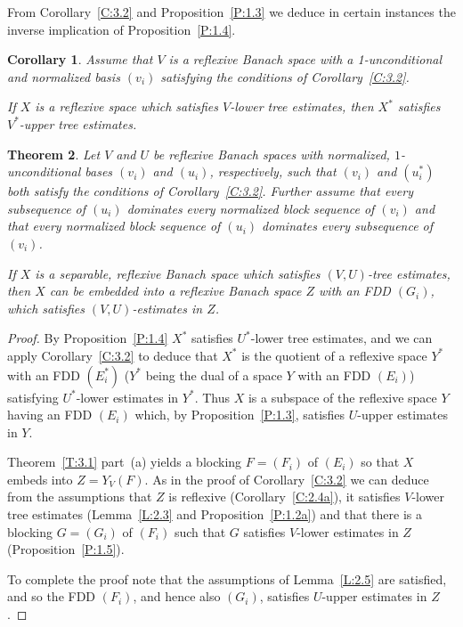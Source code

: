 \documentclass[11pt,leqno]{amsart}
\newtheorem{thm}{Theorem}[section]
\newtheorem{cor}[thm]{Corollary}
\theoremstyle{definition}
\begin{document}
From Corollary~\ref{C:3.2} and Proposition~\ref{P:1.3} we deduce in
certain instances the inverse implication of Proposition~\ref{P:1.4}.

\begin{cor}\label{C:3.2a}
  Assume that $V$ is a  reflexive  Banach space with  a
  1-unconditional and normalized basis $(v_i)$
  satisfying the conditions of Corollary~\ref{C:3.2}.
  
  If $X$ is a reflexive space which satisfies $V$-lower tree
  estimates, then $X^*$ satisfies $V^*$-upper tree estimates.
\end{cor}
\begin{thm}\label{T:3.1b}
  Let $V$ and $U$ be reflexive Banach spaces with normalized,
  $1$-unconditional bases $(v_i)$ and $(u_i)$, respectively, such that
  $(v_i)$ and $(u_i^*)$ both satisfy the conditions of
  Corollary~\ref{C:3.2}. Further assume that every subsequence of
  $(u_i)$ dominates every normalized block sequence of $(v_i)$ and
  that every normalized block sequence of $(u_i)$ dominates every
  subsequence of $(v_i)$.

  If $X$ is a separable, reflexive  Banach space which satisfies
  $(V,U)$-tree estimates, then $X$ can be embedded into a reflexive
  Banach space $Z$ with an FDD $(G_i)$, which satisfies
  $(V,U)$-estimates in $Z$.
\end{thm}
\begin{proof} By Proposition~\ref{P:1.4} $X^*$ satisfies $U^*$-lower
  tree estimates, and we can apply Corollary~\ref{C:3.2} to deduce
  that $X^*$ is the quotient of a  reflexive space $Y^*$ with an FDD
  $(E_i^*)$ ($Y^*$ being the dual of a space $Y$ with an FDD $(E_i)$)
  satisfying $U^*$-lower estimates in $Y^*$. Thus $X$ is a subspace of
  the reflexive space $Y$ having an FDD $(E_i)$ which, by
  Proposition~\ref{P:1.3}, satisfies $U$-upper estimates in $Y$.

  Theorem~\ref{T:3.1} part~(a) yields a blocking $F=(F_i)$ of $(E_i)$
  so that $X$ embeds into $Z=Y_V(F)$. As in the proof of
  Corollary~\ref{C:3.2} we can deduce from the assumptions that $Z$ is
  reflexive (Corollary~\ref{C:2.4a}), it satisfies $V$-lower tree
  estimates (Lemma~\ref{L:2.3} and Proposition~\ref{P:1.2a}) and that
  there is a blocking $G=(G_i)$ of $(F_i)$ such that $G$ satisfies
  $V$-lower estimates in $Z$ (Proposition~\ref{P:1.5}).

  To complete the proof note that the assumptions of Lemma~\ref{L:2.5}
  are satisfied, and so the FDD $(F_i)$, and hence also $(G_i)$,
  satisfies  $U$-upper estimates in $Z$.
\end{proof}
\end{document}
